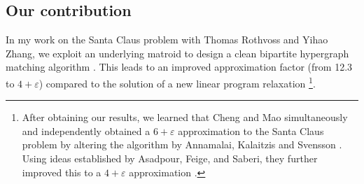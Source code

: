 

\subsection{Our contribution }
In my work on the Santa Claus problem with Thomas Rothvoss and Yihao Zhang,
we exploit an underlying matroid to design a clean bipartite hypergraph matching algorithm \cite{DaviesRZ20}. 
This leads to an improved approximation factor (from 12.3 to $4+ \varepsilon$) compared to the solution of a new linear program relaxation
\footnote{After obtaining our results, 
we learned that Cheng and Mao simultaneously and independently obtained 
a $6 + \varepsilon$ approximation to the Santa Claus problem
by altering the algorithm by Annamalai, Kalaitzis and Svensson \cite{ChengM18}.  
Using ideas established by Asadpour, Feige, and Saberi, they further improved this
to a $4 + \varepsilon$ approximation \cite{CM19, SantaClaus-AsadpourFeigeSaberi-APPROX2008}.}.

